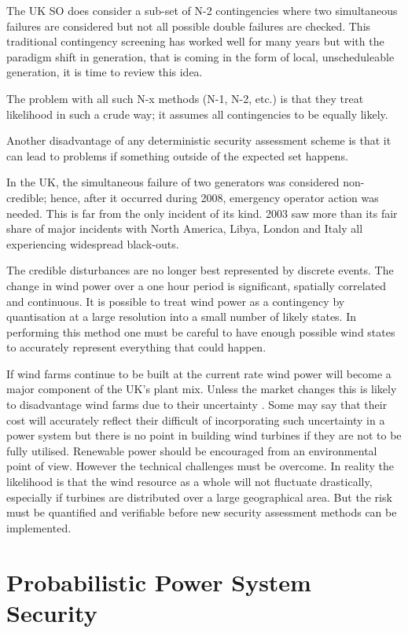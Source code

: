 \documentclass[a4paper,oneside,12pt]{report}
\begin{document}
The UK SO does consider a sub-set of N-2 contingencies where two simultaneous failures are considered but not all possible double failures are checked. This traditional contingency screening has worked well for many years but with the paradigm shift in generation, that is coming in the form of local, unscheduleable generation, it is time to review this idea.

The problem with all such N-x methods (N-1, N-2, etc.) is that they treat likelihood in such a crude way; it assumes all contingencies to be equally likely.

Another disadvantage of any deterministic security assessment scheme is that it can lead to problems if something outside of the expected set happens.

In the UK, the simultaneous failure of two generators was considered non-credible; hence, after it occurred during 2008, emergency operator action was needed. This is far from the only incident of its kind. 2003 saw more than its fair share of major incidents with North America, Libya, London and Italy \cite{El-werfelli2008} all experiencing widespread black-outs.

The credible disturbances are no longer best represented by discrete events. The change in wind power over a one hour period is significant, spatially correlated and continuous. It is possible to treat wind power as a contingency by quantisation at a large resolution into a small number of likely states. In performing this method one must be careful to have enough possible wind states to accurately represent everything that could happen.

If wind farms continue to be built at the current rate wind power will become a major component of the UK's plant mix. Unless the market changes this is likely to disadvantage wind farms due to their uncertainty \cite{BWEA2005}. Some may say that their cost will accurately reflect their difficult of incorporating such uncertainty in a power system but there is no point in building wind turbines if they are not to be fully utilised.  Renewable power should be encouraged from an environmental point of view. However the technical challenges must be overcome. In reality the likelihood is that the wind resource as a whole will not fluctuate drastically, especially if turbines are distributed over a large geographical area. But the risk must be quantified and verifiable before new security assessment methods can be implemented.

\section{Probabilistic Power System Security}
\end{document}
